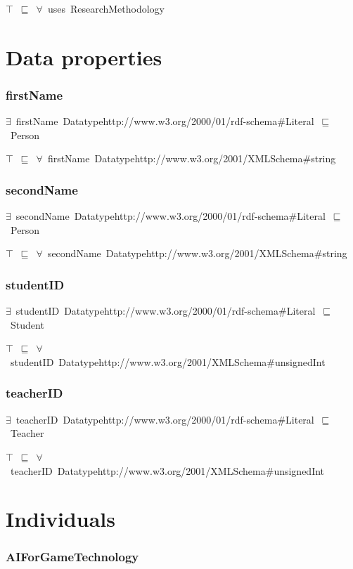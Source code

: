 \documentclass{article}
\begin{document}
\ensuremath{\top}~\ensuremath{\sqsubseteq}~\ensuremath{\forall}~uses~ResearchMethodology

\section*{Data properties}\subsubsection*{firstName}

\ensuremath{\exists}~firstName~Datatypehttp://www.w3.org/2000/01/rdf-schema#Literal~\ensuremath{\sqsubseteq}~Person

\ensuremath{\top}~\ensuremath{\sqsubseteq}~\ensuremath{\forall}~firstName~Datatypehttp://www.w3.org/2001/XMLSchema#string

\subsubsection*{secondName}

\ensuremath{\exists}~secondName~Datatypehttp://www.w3.org/2000/01/rdf-schema#Literal~\ensuremath{\sqsubseteq}~Person

\ensuremath{\top}~\ensuremath{\sqsubseteq}~\ensuremath{\forall}~secondName~Datatypehttp://www.w3.org/2001/XMLSchema#string

\subsubsection*{studentID}

\ensuremath{\exists}~studentID~Datatypehttp://www.w3.org/2000/01/rdf-schema#Literal~\ensuremath{\sqsubseteq}~Student

\ensuremath{\top}~\ensuremath{\sqsubseteq}~\ensuremath{\forall}~studentID~Datatypehttp://www.w3.org/2001/XMLSchema#unsignedInt

\subsubsection*{teacherID}

\ensuremath{\exists}~teacherID~Datatypehttp://www.w3.org/2000/01/rdf-schema#Literal~\ensuremath{\sqsubseteq}~Teacher

\ensuremath{\top}~\ensuremath{\sqsubseteq}~\ensuremath{\forall}~teacherID~Datatypehttp://www.w3.org/2001/XMLSchema#unsignedInt

\section*{Individuals}\subsubsection*{AIForGameTechnology}
\end{document}

